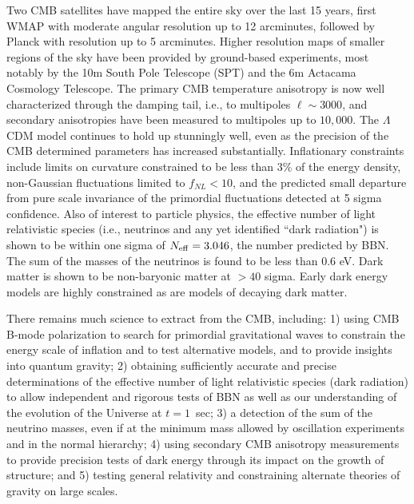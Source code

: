 Two CMB satellites have mapped the entire sky over the last 15 years, first WMAP with moderate angular resolution up to 12 arcminutes, followed by Planck with resolution up to 5 arcminutes. Higher resolution maps of smaller regions of the sky have been provided by ground-based experiments, most notably by the 10m South Pole Telescope (SPT) and the 6m Actacama Cosmology Telescope. The primary CMB temperature anisotropy is now well characterized through the damping tail, i.e., to multipoles $\ell \sim 3000$, and secondary anisotropies have been measured to multipoles up to  $10,000$.   The $\Lambda$CDM model continues to hold up stunningly well, even as the precision of the CMB determined parameters has increased substantially. Inflationary constraints include limits on curvature constrained to be less than 3\% of the energy density, non-Gaussian fluctuations limited to $f_{NL} < 10$, and 
the predicted small departure from pure scale invariance of the primordial fluctuations detected at 5 sigma confidence. Also of interest to particle physics, the effective number of light relativistic species (i.e., neutrinos and any yet identified ``dark radiation") is shown to be within one sigma of $N_\mathrm{eff} = 3.046$, the number predicted by BBN.  The sum of the masses of the neutrinos is found to be less than 0.6 eV. Dark matter is shown to be non-baryonic matter at $> 40$ sigma. Early dark energy models are highly constrained as are models of decaying dark matter. 

There remains much science to extract from the CMB, including: 1) using CMB B-mode polarization to search for primordial gravitational waves to constrain the energy scale of inflation and to test alternative models, and to provide insights into quantum gravity; 2) obtaining sufficiently accurate and precise determinations of the effective number of light relativistic species (dark radiation) to allow independent and rigorous tests of BBN as well as our understanding of the evolution of the Universe at $t = 1$\ sec; 3) a detection of the sum of the neutrino masses, even if at the minimum mass allowed by oscillation experiments and in the normal hierarchy; 4) using secondary CMB anisotropy measurements to provide precision tests of dark energy through its impact on the growth of structure; and 5) testing general relativity and constraining alternate theories of gravity on large scales.

